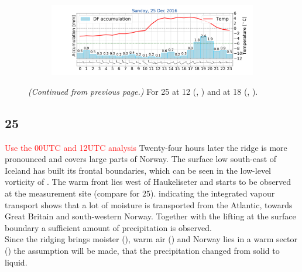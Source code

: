 \begin{figure}
\begin{subfigure}[b]{0.49\textwidth}
		\includegraphics[trim={4.9cm 1.cm 1.5cm 1cm},clip,
		width=\textwidth]{./fig_weathermast/T_P_U_20161225}
		\caption{} \label{fig:TPU25}
	\end{subfigure}
	\caption{\textit{(Continued from previous page.)} For \SI{25}{\dec} at \SI{12}{\UTC} (\protect{}, \protect{}) and at \SI{18}{\UTC} (\protect{}, \protect{}).}
\end{figure}
\subsection*{\SI{25}{\dec}}
\textcolor{red}{Use the 00UTC and 12UTC analysis}
\noindent Twenty-four hours later the ridge is more pronounced and covers large parts of Norway. The surface low south-east of Iceland has built its frontal boundaries, which can be seen in the low-level vorticity of . The warm front lies west of Haukeliseter and starts to be observed at the measurement site (compare  for \SI{25}{\dec}).  indicating the integrated vapour transport shows that a lot of moisture is transported from the Atlantic, towards Great Britain and south-western Norway. Together with the lifting at the surface boundary a sufficient amount of precipitation is observed. 
\\
Since the ridging brings moister (), warm air () and Norway lies in a warm sector () the assumption will be made, that the precipitation changed from solid to liquid. 


